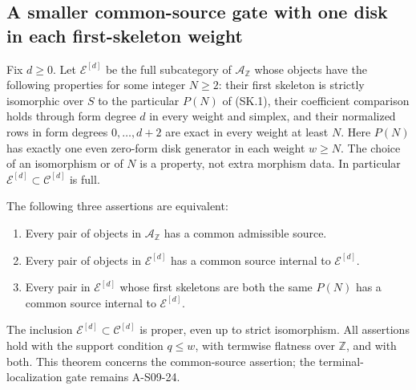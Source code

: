 \subsection{A smaller common-source gate with one disk in each first-skeleton weight}

Fix $d\geq0$.  Let $\mathcal E^{[d]}$ be the full
subcategory of $\mathcal A_{\mathbb Z}$ whose objects
have the following properties for some integer $N\geq2$:
their first skeleton is strictly isomorphic over $S$
to the particular $P(N)$ of (SK.1), their coefficient
comparison holds through form degree $d$ in every
weight and simplex, and their normalized rows in form
degrees $0,\ldots,d+2$ are exact in every weight
at least $N$.  Here $P(N)$ has exactly one even
zero-form disk generator in each weight $w\geq N$.
The choice of an isomorphism or of $N$ is a property,
not extra morphism data.  In particular
$\mathcal E^{[d]}\subset\mathcal C^{[d]}$ is full.

\begin{theorem}
\label{AS0927}
The following three assertions are equivalent:
\begin{enumerate}
\item Every pair of objects in $\mathcal A_{\mathbb Z}$
has a common admissible source.
\item Every pair of objects in $\mathcal E^{[d]}$
has a common source internal to $\mathcal E^{[d]}$.
\item Every pair in $\mathcal E^{[d]}$ whose first
skeletons are both the same $P(N)$ has a common source
internal to $\mathcal E^{[d]}$.
\end{enumerate}
The inclusion $\mathcal E^{[d]}\subset\mathcal C^{[d]}$
is proper, even up to strict isomorphism.
All assertions hold with the support condition $q\leq w$,
with termwise flatness over $\mathbb Z$, and with both.
This theorem concerns the common-source assertion;
the terminal-localization gate remains A-S09-24.
\end{theorem}

